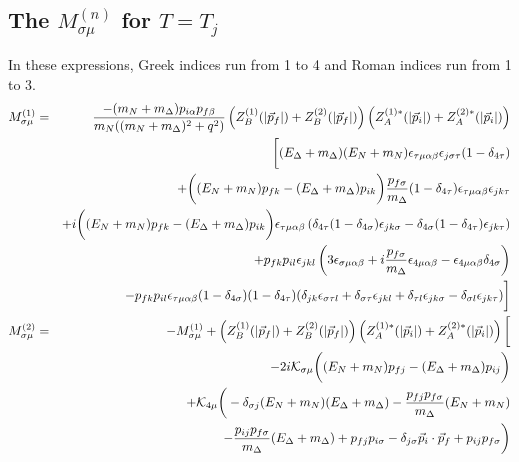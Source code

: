 \documentclass[12pt]{article}
\begin{document}
\subsection{The $M_{\sigma\mu}^{(n)}$ for $T=T_j$}

In these expressions, Greek indices run from 1 to 4
and Roman indices run from 1 to 3.
\begin{eqnarray}
M_{\sigma\mu}^{(1)}
 &=& \frac{-(m_N+m_\Delta)p_{i\alpha}p_{f\beta}}{m_N((m_N+m_\Delta)^2+q^2)}
     \left(Z_B^{(1)}(|\vec{p}_f|)+Z_B^{(2)}(|\vec{p}_f|)\right)
     \left(Z_A^{(1)*}(|\vec{p}_i|)+Z_A^{(2)*}(|\vec{p}_i|)\right) \nonumber \\
 & & \bigg[(E_\Delta+m_\Delta)(E_N+m_N)\epsilon_{\tau\mu\alpha\beta}
     \epsilon_{j\sigma\tau}(1-\delta_{4\tau}) \nonumber \\
 & & + \bigg((E_N+m_N)p_{fk}-(E_\Delta+m_\Delta)p_{ik}\bigg)
       \frac{p_{f\sigma}}{m_\Delta}(1-\delta_{4\tau})
       \epsilon_{\tau\mu\alpha\beta}\epsilon_{jk\tau} \nonumber \\
 & & + i\bigg((E_N+m_N)p_{fk}-(E_\Delta+m_\Delta)p_{ik}\bigg)
       \epsilon_{\tau\mu\alpha\beta}\left(\delta_{4\tau}
       (1-\delta_{4\sigma})\epsilon_{jk\sigma}-\delta_{4\sigma}
       (1-\delta_{4\tau})\epsilon_{jk\tau}\right) \nonumber \\
 & & + p_{fk}p_{il}\epsilon_{jkl}\left(3\epsilon_{\sigma\mu\alpha\beta}
       +i\frac{p_{f\sigma}}{m_\Delta}\epsilon_{4\mu\alpha\beta}
       -\epsilon_{4\mu\alpha\beta}\delta_{4\sigma}\right) \nonumber \\
 & & - p_{fk}p_{il}\epsilon_{\tau\mu\alpha\beta}(1-\delta_{4\sigma})
       (1-\delta_{4\tau})(\delta_{jk}\epsilon_{\sigma\tau l}
       +\delta_{\sigma\tau}\epsilon_{jkl}+\delta_{\tau l}\epsilon_{jk\sigma}
       -\delta_{\sigma l}\epsilon_{jk\tau})\bigg] \\
M_{\sigma\mu}^{(2)}
 &=& -M_{\sigma\mu}^{(1)} 
     + \left(Z_B^{(1)}(|\vec{p}_f|)+Z_B^{(2)}(|\vec{p}_f|)\right)
       \left(Z_A^{(1)*}(|\vec{p}_i|)+Z_A^{(2)*}(|\vec{p}_i|)\right)\bigg[
       \nonumber \\
&& -2i{\cal K}_{\sigma\mu}\bigg((E_N+m_N)p_{fj}-(E_\Delta+m_\Delta)p_{ij}\bigg)
   \nonumber \\
&& +{\cal K}_{4\mu}\bigg(-\delta_{\sigma j}(E_N+m_N)(E_\Delta+m_\Delta)
   -\frac{p_{fj}p_{f\sigma}}{m_\Delta}(E_N+m_N) \nonumber \\
&& -\frac{p_{ij}p_{f\sigma}}{m_\Delta}(E_\Delta+m_\Delta)
   +p_{fj}p_{i\sigma}-\delta_{j\sigma}\vec p_i\cdot\vec p_f+p_{ij}p_{f\sigma}
   \bigg) \nonumber \\

\end{eqnarray}
\end{document}
